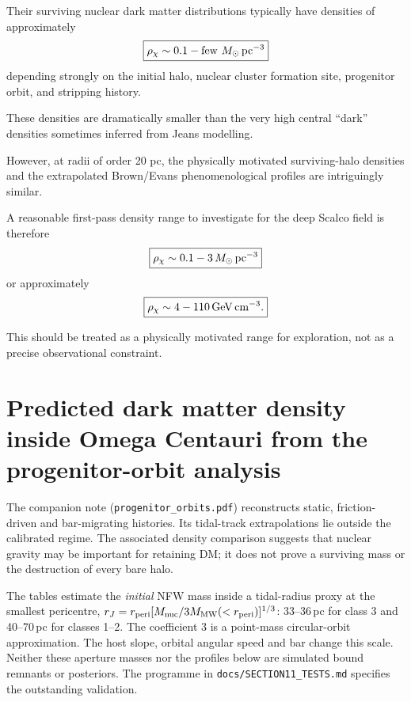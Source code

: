 \documentclass[11pt,a4paper]{article}
\begin{document}
Their surviving nuclear dark matter distributions typically have densities of approximately
\begin{equation}
\boxed{
\rho_\chi\sim0.1-\mathrm{few}
\ M_\odot\,{\rm pc}^{-3}
}
\end{equation}
depending strongly on the initial halo, nuclear cluster formation site, progenitor orbit, and stripping history.

These densities are dramatically smaller than the very high central ``dark'' densities sometimes inferred from Jeans modelling.

However, at radii of order 20 pc, the physically motivated surviving-halo densities and the extrapolated Brown/Evans phenomenological profiles are intriguingly similar.

A reasonable first-pass density range to investigate for the deep Scalco field is therefore
\begin{equation}
\boxed{
\rho_\chi\sim0.1-3\,
M_\odot\,{\rm pc}^{-3}
}
\end{equation}
or approximately
\begin{equation}
\boxed{
\rho_\chi\sim4-110\,
{\rm GeV\,cm^{-3}}.
}
\end{equation}

This should be treated as a physically motivated range for exploration, not as a precise observational constraint.



\section{Predicted dark matter density inside Omega Centauri from the progenitor-orbit analysis}
\label{sec:budget}

The companion note (\texttt{progenitor\_orbits.pdf}) reconstructs static, friction-driven
and bar-migrating histories. Its tidal-track extrapolations lie outside the calibrated
regime. The associated density comparison suggests that nuclear gravity may be important
for retaining DM; it does not prove a surviving mass or the destruction of every bare halo.

The tables estimate the \emph{initial} NFW mass inside a tidal-radius proxy at the smallest
pericentre, $r_J=r_{\rm peri}[M_{\rm nuc}/3M_{\rm MW}(<r_{\rm peri})]^{1/3}$: 33--36\,pc for
class 3 and 40--70\,pc for classes 1--2. The coefficient 3 is a point-mass circular-orbit
approximation. The host slope, orbital angular speed and bar change this scale. Neither
these aperture masses nor the profiles below are simulated bound remnants or posteriors.
The programme in \texttt{docs/SECTION11\_TESTS.md} specifies the outstanding validation.
\end{document}
